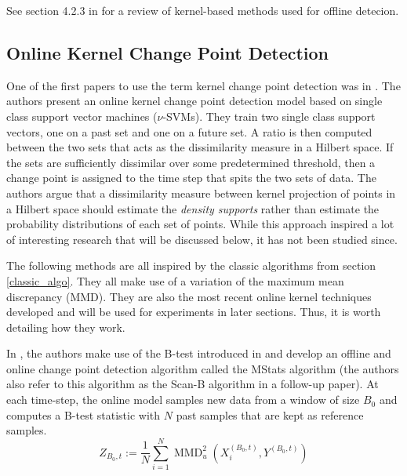 See section 4.2.3  in \cite{truong2018review} for a review of kernel-based methods used for offline detecion. 

\subsection{Online Kernel Change Point Detection}
One of the first papers to use the term kernel change point detection was in \cite{desobry2005online}. The authors present an online kernel change point detection model based on single class support vector machines ($\nu$-SVMs). They train two single class support vectors, one on a past set and one on a future set. A ratio is then computed between the two sets that acts as the dissimilarity measure in a Hilbert space. If the sets are sufficiently dissimilar over some predetermined threshold, then a change point is assigned to the time step that spits the two sets of data. The authors argue that a dissimilarity measure between kernel projection of points in a Hilbert space should estimate the \textit{density supports} rather than estimate the probability distributions of each set of points. While this approach inspired a lot of interesting research that will be discussed below, it has not been studied since.

The following methods are all inspired by the classic algorithms from section \ref{classic_algo}. They all make use of a variation of the maximum mean discrepancy (MMD). They are also the most recent online kernel techniques developed and will be used for experiments in later sections. Thus, it is worth detailing how they work.

In  \cite{li2015m}, the authors make use of the B-test introduced in \cite{zaremba2013b} and develop an offline and online change point detection algorithm called the MStats algorithm (the authors also refer to this algorithm as the Scan-B algorithm in a follow-up paper). At each time-step, the online model samples new data from a window of size $B_0$ and computes a B-test statistic with $N$ past samples that are kept as reference samples. 
\begin{equation}
Z_{B_{0}, t}:=\frac{1}{N} \sum_{i=1}^{N} \operatorname{MMD}_{u}^{2}\left(X_{i}^{\left(B_{0}, t\right)}, Y^{\left(B_{0}, t\right)}\right)
\end{equation}

